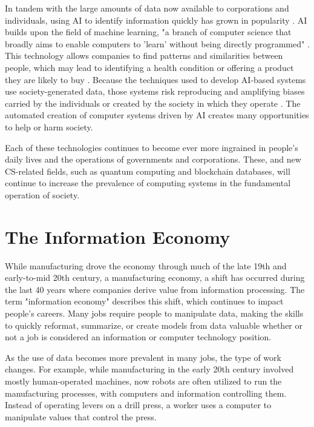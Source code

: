 In tandem with the large amounts of data now available to corporations and individuals, using AI to identify information quickly has grown in popularity \parencite{vinichenko_threats_2021}. AI builds upon the field of machine learning, "a branch of computer science that broadly aims to enable computers to 'learn' without being directly programmed" \parencite[p. 2222]{bi_what_2019}. This technology allows companies to find patterns and similarities between people, which may lead to identifying a health condition or offering a product they are likely to buy \parencite{fennelly_for_2021, ma_machine_2020}. Because the techniques used to develop AI-based systems use society-generated data, those systems risk reproducing and amplifying biases carried by the individuals or created by the society in which they operate \parencite{wiens_diagnosing_2020}. The automated creation of computer systems driven by AI creates many opportunities to help or harm society.

Each of these technologies continues to become ever more ingrained in people's daily lives and the operations of governments and corporations. These, and new CS-related fields, such as quantum computing and blockchain databases, will continue to increase the prevalence of computing systems in the fundamental operation of society.


\section{The Information Economy}

While manufacturing drove the economy through much of the late 19th and early-to-mid 20th century, a manufacturing economy, a shift has occurred during the last 40 years where companies derive value from information processing. The term "information economy" describes this shift, which continues to impact people's careers. Many jobs require people to manipulate data, making the skills to quickly reformat, summarize, or create models from data valuable whether or not a job is considered an information or computer technology position.

As the use of data becomes more prevalent in many jobs, the type of work changes. For example, while manufacturing in the early 20th century involved mostly human-operated machines, now robots are often utilized to run the manufacturing processes, with computers and information controlling them. Instead of operating levers on a drill press, a worker uses a computer to manipulate values that control the press.

